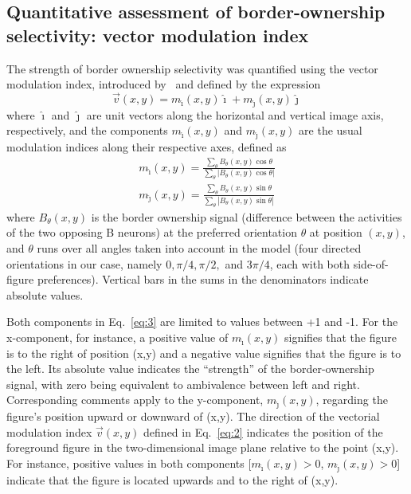 \subsection{Quantitative assessment of border-ownership selectivity:
  vector modulation index}
\label{sec:vmi}

The strength of border ownership selectivity was quantified using the
vector modulation index, introduced by~\cite{Craft_etal07} and defined
by the expression 
\begin{equation}
\label{eq:2}
\vec{v}(x,y) = m_{\hat{\imath}}(x,y)\hat{\imath} + m_{\hat{\jmath}}(x,y)\hat{\jmath}
\end{equation}
where $\hat{\imath}$ and $\hat{\jmath}$ are unit vectors along the horizontal and vertical image
axis, respectively, and the components $m_{\hat{\imath}}(x,y)$ and $m_{\hat{\jmath}}(x,y)$ are the usual modulation indices along their respective axes, defined as
\begin{equation}
\label{eq:3}
\begin{split}
	m_{\hat{\imath}}(x,y) = \frac{\sum_{\theta}
        B_{\theta}(x,y)\cos\theta}{\sum_{\theta}
                \left|B_{\theta}(x,y)\cos\theta\right|} \\
	m_{\hat{\jmath}}(x,y) = \frac{\sum_{\theta}
        B_{\theta}(x,y)\sin\theta}{\sum_{\theta}
                \left|B_{\theta}(x,y)\sin\theta\right|}
\end{split}
\end{equation}
where $B_{\theta}(x,y)$ is the border ownership signal (difference between
the activities of the two opposing B neurons) at the preferred
orientation $\theta$ at position $(x,y)$, and $\theta$ runs over all
angles taken into account in the model 
(four directed orientations in our case, namely $0, \pi/4, \pi/2,$
and $3\pi/4$, each with both side-of-figure preferences). 
Vertical bars in the sums in the denominators indicate absolute values.

Both components in Eq.~\ref{eq:3} are limited to values between +1 and
-1. For the x-component, for instance, a positive value of
$m_{\hat{\imath}}(x,y)$ signifies that the figure is to the right of
position (x,y) and a negative value signifies that the figure is to
the left. Its absolute value indicates the ``strength'' of the
border-ownership signal, with zero being equivalent to ambivalence
between left and right. Corresponding comments apply to the
y-component, $m_{\hat{\jmath}}(x,y)$, regarding the figure's position
upward or downward of (x,y). The direction of the vectorial modulation
index $\vec{v}(x,y)$ defined in Eq.~\ref{eq:2} indicates the position
of the foreground figure in the two-dimensional image plane relative
to the point (x,y). For instance, positive values in both components
[$m_{\hat{\imath}}(x,y) > 0$, $m_{\hat{\jmath}}(x,y) > 0$] indicate
that the figure is located upwards and to the right of (x,y).

